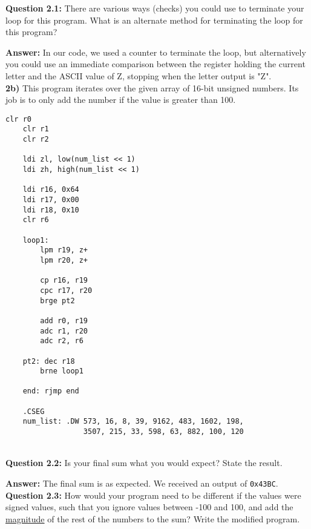 \documentclass[titlepage, 12pt]{article}
\newcommand{\hi}{\hangindent=0.5in}
\begin{document}
	\hi \textbf{Question 2.1:} There are various ways (checks) you could use to terminate your loop for this program. What is an alternate method for terminating the loop for this program?
	
	\hi \textbf{Answer:} In our code, we used a counter to terminate the loop, but alternatively you could use an immediate comparison between the register holding the current letter and the ASCII value of Z, stopping when the letter output is "Z".\\
	
	\noindent\textbf{2b)} This program iterates over the given array of 16-bit unsigned numbers. Its job is to only add the number if the value is greater than 100.
	
	\begin{lstlisting}[style=AVR]
	clr r0 
	clr r1 
	clr r2 
	
	ldi zl, low(num_list << 1) 
	ldi zh, high(num_list << 1) 
	
	ldi r16, 0x64 
	ldi r17, 0x00 
	ldi r18, 0x10 
	clr r6 
	
	loop1: 
		lpm r19, z+ 
		lpm r20, z+ 
		
		cp r16, r19 
		cpc r17, r20 
		brge pt2 
		
		add r0, r19 
		adc r1, r20 
		adc r2, r6 
	
	pt2: dec r18 
		brne loop1 
	
	end: rjmp end 
	
	.CSEG 
	num_list: .DW 573, 16, 8, 39, 9162, 483, 1602, 198,
				  3507, 215, 33, 598, 63, 882, 100, 120 
	\end{lstlisting}~\\
	
	\hi \textbf{Question 2.2:} Is your final sum what you would expect? State the result.
	
	\hi \textbf{Answer:} The final sum is as expected. We received an output of \texttt{0x43BC}.\\
	
	\hi \textbf{Question 2.3:} How would your program need to be different if the values were signed values, such that you ignore values between -100 and 100, and add the \underline{magnitude} of the rest of the numbers to the sum? Write the modified program.
	
\end{document}

